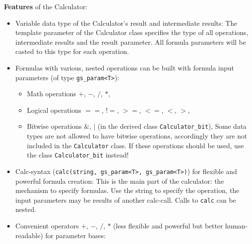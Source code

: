 \textbf{Features} of the Calculator:
\begin{itemize}
  \item Variable data type of the Calculator's result and intermediate results:  \vspace{.5em} \newline
  	The template parameter of the Calculator class specifies the type of all operations, intermediate 
	results and the result parameter. All formula parameters will be casted to this type for each operation.
  \item Formulas with various, nested operations can be built with formula input parameters \newline
	(of type \lstinline|gs_param<T>|):
	\begin{itemize}
	  \item Math operations 
		\colorbox{hellgrau}{$+$}, \colorbox{hellgrau}{$-$}, \colorbox{hellgrau}{$/$}, \colorbox{hellgrau}{$*$},
	  \item Logical operations
	  	\colorbox{hellgrau}{$==$}, \colorbox{hellgrau}{$!=$}, \colorbox{hellgrau}{$>=$}, 
		\colorbox{hellgrau}{$<=$}, \colorbox{hellgrau}{$<$}, \colorbox{hellgrau}{$>$},
	  \item Bitwise operations 
	  	\colorbox{hellgrau}{$\&$}, \colorbox{hellgrau}{$|$} 
		(in the derived class \lstinline|Calculator_bit|), \vspace{.5em} \newline
	           \WarningSymbol{} Some data types are not allowed to have bitwise operations, accordingly 
	           they are not included in the \lstinline|Calculator| class. If these operations should be used, 
	           use the class \lstinline|Calculator_bit| instead!
	\end{itemize}
  \item Calc-syntax (\lstinline|calc(string, gs_param<T>, gs_param<T>)|) for flexible and powerful 
  	formula creation: \vspace{.5em} \newline
	This is the main part of the calculator: the mechanism to specify formulas. Use the string 
	to specify the operation, the input parameters may be results of another calc-call. 
	Calls to \lstinline|calc| can be nested.
  \item Convenient operators \colorbox{hellgrau}{$+$}, \colorbox{hellgrau}{$-$}, 
  	\colorbox{hellgrau}{$/$}, \colorbox{hellgrau}{$*$} 
	(less flexible and powerful but better human-readable) for parameter bases: \vspace{.5em} \newline

\end{itemize}
